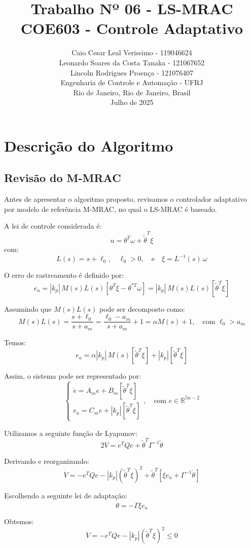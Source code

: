 \documentclass[10pt]{article}
\title{
    Trabalho Nº 06 - LS-MRAC \\
    \large COE603 - Controle Adaptativo
}
\author{
    Caio Cesar Leal Verissimo - 119046624 \\
    Leonardo Soares da Costa Tanaka - 121067652 \\
    Lincoln Rodrigues Proença - 121076407 \\
    Engenharia de Controle e Automação - UFRJ \\
    Rio de Janeiro, Rio de Janeiro, Brasil \\
    Julho de 2025
}
\date{}
\begin{document}
\maketitle

\tableofcontents
\newpage

\section{Descrição do Algoritmo}

\subsection{Revisão do M-MRAC}

Antes de apresentar o algoritmo proposto, revisamos o controlador adaptativo por modelo de referência M-MRAC, no qual o LS-MRAC é baseado.

A lei de controle considerada é:
\[
u = \theta^T \omega + \dot{\tilde{\theta}}^T \xi
\]
com:
\[
L(s) = s + \ell_0, \quad \ell_0 > 0, \quad \text{e} \quad \xi = L^{-1}(s)\, \omega
\]

O erro de rastreamento é definido por:
\[
e_a = |k_p|\, M(s)L(s)\left[\theta^T \xi - \theta^{*T} \omega\right] = |k_p|\, M(s)L(s)\left[\tilde{\theta}^T \xi\right]
\]

Assumindo que \( M(s)L(s) \) pode ser decomposto como:
\[
M(s)L(s) = \frac{s + \ell_0}{s + a_m} = \frac{\ell_0 - a_m}{s + a_m} + 1 = \alpha M(s) + 1, \quad \text{com } \ell_0 > a_m
\]

Temos:
\[
e_a = \alpha |k_p|\, M(s)[\tilde{\theta}^T \xi] + |k_p|[\tilde{\theta}^T \xi]
\]

Assim, o sistema pode ser representado por:
\[
\begin{cases}
\dot{e} = A_m e + B_m[\tilde{\theta}^T \xi] \\
e_a = C_m e + |k_p|[\tilde{\theta}^T \xi]
\end{cases}, \quad \text{com } e \in \mathbb{R}^{5n - 2}
\]

Utilizamos a seguinte função de Lyapunov:
\[
2V = e^T Q e + \tilde{\theta}^T \Gamma^{-1} \tilde{\theta}
\]

Derivando e reorganizando:
\[
\dot{V} = -e^T Q e - |k_p| (\tilde{\theta}^T \xi)^2 + \tilde{\theta}^T \left[ \xi e_a + \Gamma^{-1} \dot{\theta} \right]
\]

Escolhendo a seguinte lei de adaptação:
\[
\dot{\theta} = -\Gamma \xi e_a
\]

Obtemos:
\[
\dot{V} = -e^T Q e - |k_p| (\tilde{\theta}^T \xi)^2 \leq 0
\]
\end{document}
